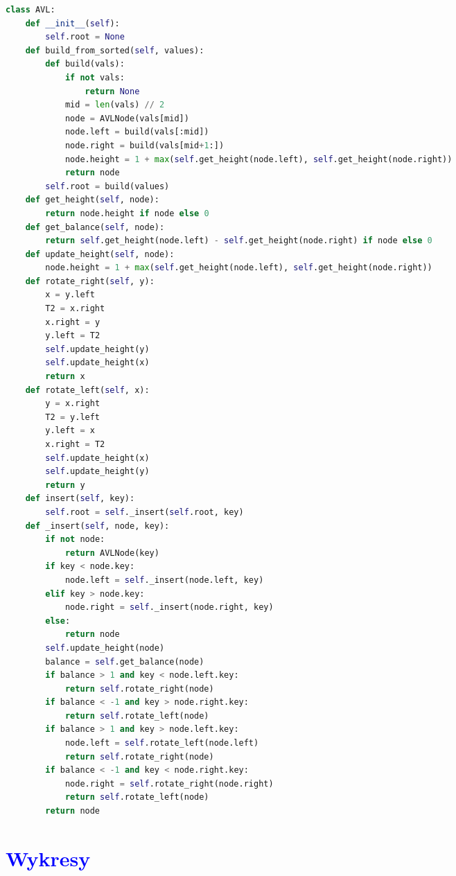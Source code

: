 \documentclass{article}
\begin{document}
\begin{multicols}{2}
\begin{tcolorbox}[colback=black,colframe=gray!50!,arc=3mm,boxrule=0pt,left=0pt,right=0pt,width=\linewidth, sharp corners=south]
\begin{lstlisting}[language=Python]
class AVL:
	def __init__(self):
		self.root = None
	def build_from_sorted(self, values):
		def build(vals):
			if not vals:
				return None
			mid = len(vals) // 2
			node = AVLNode(vals[mid])
			node.left = build(vals[:mid])
			node.right = build(vals[mid+1:])
			node.height = 1 + max(self.get_height(node.left), self.get_height(node.right))
			return node
		self.root = build(values)
	def get_height(self, node):
		return node.height if node else 0
	def get_balance(self, node):
		return self.get_height(node.left) - self.get_height(node.right) if node else 0
	def update_height(self, node):
		node.height = 1 + max(self.get_height(node.left), self.get_height(node.right))
	def rotate_right(self, y):
		x = y.left
		T2 = x.right
		x.right = y
		y.left = T2
		self.update_height(y)
		self.update_height(x)
		return x
	def rotate_left(self, x):
		y = x.right
		T2 = y.left
		y.left = x
		x.right = T2
		self.update_height(x)
		self.update_height(y)
		return y
	def insert(self, key):
		self.root = self._insert(self.root, key)
	def _insert(self, node, key):
		if not node:
			return AVLNode(key)
		if key < node.key:
			node.left = self._insert(node.left, key)
		elif key > node.key:
			node.right = self._insert(node.right, key)
		else:
			return node
		self.update_height(node)
		balance = self.get_balance(node)
		if balance > 1 and key < node.left.key:
			return self.rotate_right(node)
		if balance < -1 and key > node.right.key:
			return self.rotate_left(node)
		if balance > 1 and key > node.left.key:
			node.left = self.rotate_left(node.left)
			return self.rotate_right(node)
		if balance < -1 and key < node.right.key:
			node.right = self.rotate_right(node.right)
			return self.rotate_left(node)
		return node
			\end{lstlisting}
		\end{tcolorbox}
	\end{multicols}
	
	\newpage
	\section*{\textcolor{blue}{Wykresy}}
	
\end{document}
